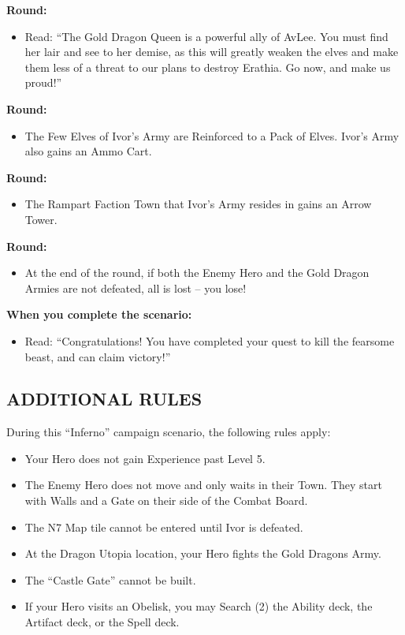 \begin{multicols*}{2}
\textbf{ Round:}
\begin{itemize}
  \item Read: ``The Gold Dragon Queen is a powerful ally of AvLee.
    You must find her lair and see to her demise, as this will greatly weaken
    the elves and make them less of a threat to our plans to destroy Erathia.
    Go now, and make us proud!''
\end{itemize}

\textbf{ Round:}
\begin{itemize}
  \item The Few Elves of Ivor's Army are Reinforced to a Pack of Elves.
    Ivor's Army also gains an Ammo Cart.
\end{itemize}

\textbf{ Round:}
\begin{itemize}
  \item The Rampart Faction Town that Ivor's Army resides in gains an Arrow Tower.
\end{itemize}

\textbf{ Round:}
\begin{itemize}
  \item At the end of the round, if both the Enemy Hero and the Gold Dragon Armies are not defeated, all is lost -- you lose!
\end{itemize}

\textbf{When you complete the scenario:}
\begin{itemize}
  \item Read: ``Congratulations! You have completed your quest to kill the fearsome beast, and can claim victory!''
\end{itemize}


\subsection*{\MakeUppercase{Additional rules}}

During this ``Inferno'' campaign scenario, the following rules apply:

\begin{itemize}
    \item Your Hero does not gain Experience past Level 5.
    \item The Enemy Hero does not move and only waits in their Town. They start with Walls and a Gate on their side of the Combat Board.
    \item The N7 Map tile cannot be entered until Ivor is defeated.
    \item At the Dragon Utopia location, your Hero fights the Gold Dragons Army.
    \item The ``Castle Gate'' cannot be built.
    \item If your Hero visits an Obelisk, you may Search (2) the Ability deck, the Artifact deck, or the Spell deck.
\end{itemize}

\end{multicols*}

